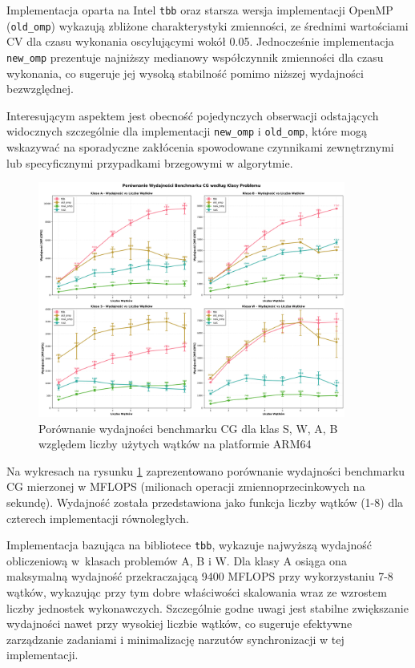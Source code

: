 Implementacja oparta na Intel \texttt{tbb} oraz starsza wersja implementacji OpenMP (\texttt{old\_omp}) wykazują zbliżone charakterystyki zmienności, ze średnimi wartościami CV dla czasu wykonania oscylującymi wokół 0.05. Jednocześnie implementacja \texttt{new\_omp} prezentuje najniższy medianowy współczynnik zmienności dla czasu wykonania, co sugeruje jej wysoką stabilność pomimo niższej wydajności bezwzględnej.

Interesującym aspektem jest obecność pojedynczych obserwacji odstających widocznych szczególnie dla implementacji \texttt{new\_omp} i \texttt{old\_omp}, które mogą wskazywać na sporadyczne zakłócenia spowodowane czynnikami zewnętrznymi lub specyficznymi przypadkami brzegowymi w algorytmie.

\begin{figure}[H]
    \centering
    \includegraphics[width=0.9\textwidth]{analiza/images/parallel/cg/x86/cg_porownanie_wydajnosci.png}
    \caption{Porównanie wydajności benchmarku CG dla klas S, W, A, B względem liczby użytych wątków na platformie ARM64}
    \label{cg_porownanie_wydajnosci_x86_64}
\end{figure}
Na wykresach na rysunku \ref{cg_porownanie_wydajnosci_x86_64} zaprezentowano porównanie wydajności benchmarku CG mierzonej w MFLOPS (milionach operacji zmiennoprzecinkowych na sekundę). Wydajność została przedstawiona jako funkcja liczby wątków (1-8) dla czterech implementacji równoległych.

Implementacja bazująca na bibliotece \texttt{tbb}, wykazuje najwyższą wydajność obliczeniową w~klasach problemów A, B i W. Dla klasy A osiąga ona maksymalną wydajność przekraczającą 9400 MFLOPS przy wykorzystaniu 7-8 wątków, wykazując przy tym dobre właściwości skalowania wraz ze wzrostem liczby jednostek wykonawczych. Szczególnie godne uwagi jest stabilne zwiększanie wydajności nawet przy wysokiej liczbie wątków, co sugeruje efektywne zarządzanie zadaniami i minimalizację narzutów synchronizacji w tej implementacji.

